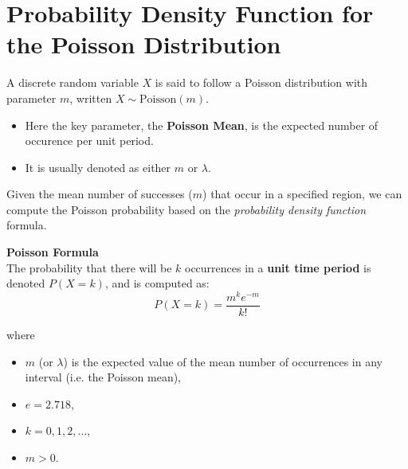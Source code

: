 \documentclass[a4paper,12pt]{article}
\begin{document}


\section*{Probability Density Function for the Poisson Distribution}
A discrete random variable $X$ is said to follow a Poisson distribution with parameter $m$, written $X \sim \mbox{Poisson}(m)$.



\begin{itemize}
	\item Here the key parameter, the \textbf{Poisson Mean}, is the expected number of occurence per unit period. 
	\item It is usually denoted as either $m$ or $\lambda$.
\end{itemize}

\noindent Given the mean number of successes ($m$) that occur in a specified region, we can compute the Poisson probability based on the \textit{probability density function} formula.



\begin{framed}
	\noindent \textbf{Poisson Formula}\\
	The probability that there will be $k$ occurrences in a \textbf{unit time period} is denoted $P(X=k)$, and is computed as:
	{
		\large
		\[ P(X = k)=\frac{m^k e^{-m}}{k!} \]
	}
\end{framed}
\noindent where




\begin{itemize} 
	\item $m$ (or $\lambda$) is the expected value of the mean number of occurrences in any interval (i.e. the Poisson mean),
	\item $e=2.718$,
	\item $k = 0, 1, 2, \ldots$,
	\item $m > 0$.
\end{itemize}
\end{document}
